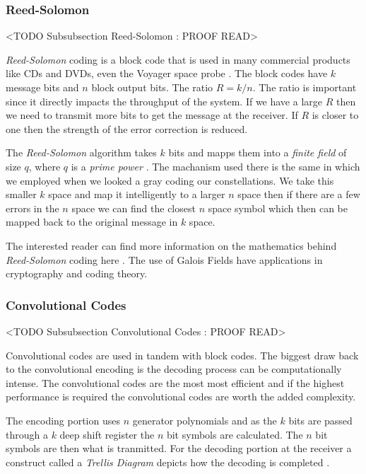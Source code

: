 	
	
\subsubsection{Reed-Solomon}
	<TODO Subsubsection  Reed-Solomon : PROOF READ>

\emph{Reed-Solomon} coding is a block code that is used in many commercial products like \ac{CD}s and \ac{DVD}s, even the Voyager space probe \cite{voyager}. The block codes have $k$ message bits and $n$ block output bits. The ratio $R=k/n$. The ratio is important since it directly impacts the throughput of the system. If we have a large $R$ then we need to transmit more bits to get the message at the receiver. If $R$ is closer to one then the strength of the error correction is reduced.

The \emph{Reed-Solomon} algorithm takes $k$ bits and mapps them into a \emph{finite field} of size $q$, where $q$ is a \emph{prime power} \cite{Sklar}. The machanism used there is the same in which we employed when we looked a gray coding our constellations. We take this smaller $k$ space and map it intelligently to a larger $n$ space then if there are a few errors in the $n$ space we can find the closest $n$ space symbol which then can be mapped back to the original message in $k$ space.

The interested reader can find more information on the mathematics behind \emph{Reed-Solomon} coding here \cite{rsmath}. The use of Galois Fields have applications in cryptography and coding theory. 
	
	
\subsubsection{Convolutional Codes}
	<TODO Subsubsection  Convolutional Codes : PROOF READ>

Convolutional codes are used in tandem with block codes. The biggest draw back to the convolutional encoding is the decoding process can be computationally intense. The convolutional codes are the most most efficient and if the highest performance is required the convolutional codes are worth the added complexity.

The encoding portion uses $n$ generator polynomials and as the $k$ bits are passed through a $k$ deep shift register the $n$ bit symbols are calculated. The $n$ bit symbols are then what is tranmitted. For the decoding portion at the receiver a construct called a \emph{Trellis Diagram} depicts how the decoding is completed \cite{trellis}.

